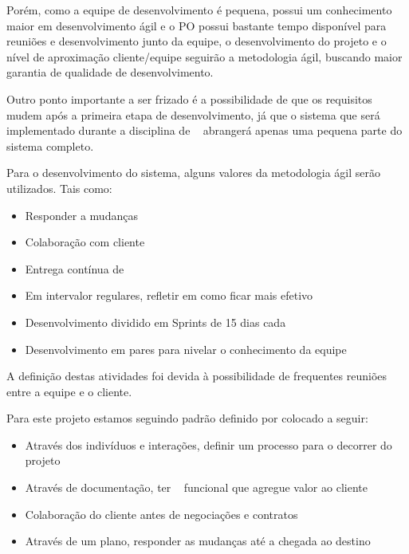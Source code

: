 Porém, como a equipe de desenvolvimento é pequena, possui um conhecimento maior em desenvolvimento ágil e o PO possui bastante tempo disponível para reuniões e desenvolvimento junto da equipe, o desenvolvimento do projeto e o nível de aproximação cliente/equipe seguirão a metodologia ágil, buscando maior garantia de qualidade de desenvolvimento.

Outro ponto importante a ser frizado é a possibilidade de que os requisitos mudem após a primeira etapa de desenvolvimento, já que o sistema que será implementado durante a disciplina de \hell~ abrangerá apenas uma pequena parte do sistema completo. 
    
Para o desenvolvimento do sistema, alguns valores da metodologia ágil serão utilizados. Tais como:

\begin{itemize}
    \item{Responder a mudanças}
    \item{Colaboração com cliente}
    \item{Entrega contínua de \sw}
    \item{Em intervalor regulares, refletir em como ficar mais efetivo}
    \item{Desenvolvimento dividido em Sprints de 15 dias cada}
    \item{Desenvolvimento em pares para nivelar o conhecimento da equipe}
\end{itemize}

A definição destas atividades foi devida à possibilidade de frequentes reuniões entre a equipe e o cliente. 

Para este projeto estamos seguindo padrão definido por \cite{cho2009hybrid} colocado a seguir:

\begin{itemize}
    \item{Através dos indivíduos e interações, definir um processo para o decorrer do projeto}
    \item{Através de documentação, ter \sw~ funcional que agregue valor ao cliente}
    \item{Colaboração do cliente antes de negociações e contratos}
    \item{Através de um plano, responder as mudanças até a chegada ao destino}
\end{itemize}
